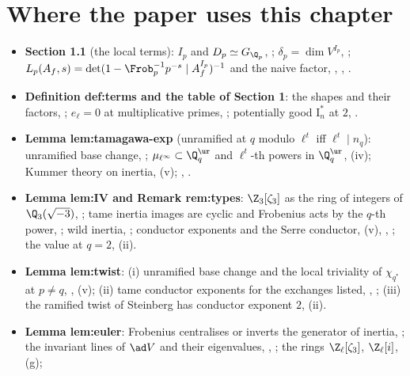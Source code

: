 \section*{Where the paper uses this chapter}

\begin{itemize}
\item \textbf{Section 1.1} (the local terms): $I_p$ and $D_p\simeq G_{\Q_p}$, ; $\delta_p=\dim V^{I_p}$, ;
$L_p(A_f,s)=\det(1-\Frob_p^{-1}p^{-s}\mid A_f^{I_p})^{-1}$ and the naive factor, , , .
\item \textbf{Definition def:terms and the table of Section 1}: the shapes and their factors, ; $e_\ell=0$ at multiplicative primes,
; potentially good $\mathrm{I}_n^*$ at $2$, .
\item \textbf{Lemma lem:tamagawa-exp} (unramified at $q$ modulo $\ell^t$ iff $\ell^t\mid n_q$): unramified base change, ; $\mu_{\ell^\infty}\subset\Q_q^{\ur}$ and
$\ell^t$-th powers in $\Q_q^{\ur}$, (iv); Kummer theory on inertia, (v); ,
.
\item \textbf{Lemma lem:IV and Remark rem:types}: $\Z_3[\zeta_3]$ as the ring of integers of $\Q_3(\sqrt{-3})$, ; tame inertia images are
cyclic and Frobenius acts by the $q$-th power, ; wild inertia, ; conductor exponents and the
Serre conductor, (v), , ; the value at $q=2$, (ii).
\item \textbf{Lemma lem:twist}: (i) unramified base change and the local triviality of $\chi_{q^*}$ at $p\ne q$, ,
(v); (ii) tame conductor exponents for the exchanges listed, , ;
(iii) the ramified twist of Steinberg has conductor exponent $2$, (ii).
\item \textbf{Lemma lem:euler}: Frobenius centralises or inverts the generator of inertia, ; the invariant lines of $\ad V$ and their
eigenvalues, , ; the rings $\Z_\ell[\zeta_3]$, $\Z_\ell[i]$, (g);

\end{itemize}
